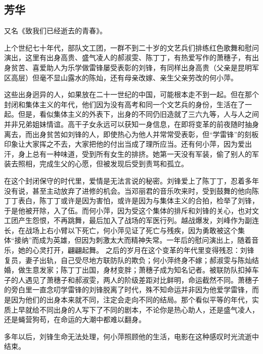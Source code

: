 \subsection{芳华}

又名《致我们已经逝去的青春》。

上个世纪七十年代，部队文工团，一群不到二十岁的文艺兵们排练红色歌舞和慰问演出，这里有出身高贵、盛气凌人的郝淑雯、陈丁丁，有热爱写作的萧穗子，有出身贫苦、喜爱助人为乐学做雷锋屡受表彰的刘锋，有同样出身高贵（父亲是昆明军区高层）但毫不显山露水的陈灿，还有母亲改嫁、亲生父亲劳改的何小萍。

这些出身迥异的人，如果放在二十一世纪的中国，可能根本走不到一起。但在那个封闭和集体主义的年代，他们因为没有高考和同一个文艺兵的身份，生活在了一起。但是，看似集体主义的外表下，出身的不同仍旧造就了三六九等，人与人之间并非兄弟姐妹情谊。高干子女永远可以获知一身信息，在即将变革的前夜随时抽身离去，而出身贫苦如刘锋的人，即使热心为他人并常常受表彰，但“学雷锋”的刻板印象让大家挥之不去，大家把他的付出当成了理所应当。还有何小萍，因为爱出汗，身上总有一种味道，受到所有女生的排挤。她第一天没有军装，偷了别人的军装去照相，完成生父的心愿，但被发现后受到责骂和孤立。

在这个封闭保守的时代里，爱情是无法言说的秘密。刘锋爱上了陈丁丁，忍着多年没有说，甚至主动放弃了进修的机会。当邓丽君的音乐吹来时，受到鼓舞的他向陈丁丁表白，陈丁丁或许是因为害怕，或许是因为与集体主义的合拍，检举了刘锋，于是他被开除，入了伍。而何小萍，因为受这个集体的排斥和刘锋的关心，也对文工团产生怨恨，不再跳舞，最后加入了战场的军医行列。越战爆发，刘峰作为副连长，在战场上右小臂以下死亡，何小萍见证了死亡与残疾，因为勇敢被这个集体“接纳”而成为英雄，但因为刺激太大而精神失常。一年后的慰问演出上，随着音乐，她的心灵打开，翩翩起舞。
之后的岁月在这个变革的年代里变得残忍：刘锋复员，妻子出轨，自己受尽地方联防队的欺负；何小萍终身不嫁；郝淑雯与陈灿结婚，做生意发家；陈丁丁出国，身材变胖；萧穗子成为知名记者。被联防队扣掉车子的人遇见了萧穗子和郝淑雯，两人的阶级差距对比鲜明，命运截然不同。萧穗子的旁白里一直念叨学雷锋的刘锋脱离了时代，殊不知命运并非因为他爱学雷锋，而是因为他们的出身本来就不同，注定会走向不同的结局。那个看似平等的年代，实质上早就给不同出身的人写下了不同的剧本，不论你是热心助人，还是盛气凌人，还是蝇营狗苟，在命运的大潮中都难以翻身。

多年以后，刘锋生命无法处理，何小萍照顾他的生活，电影在这种感叹时光流逝中结束。

